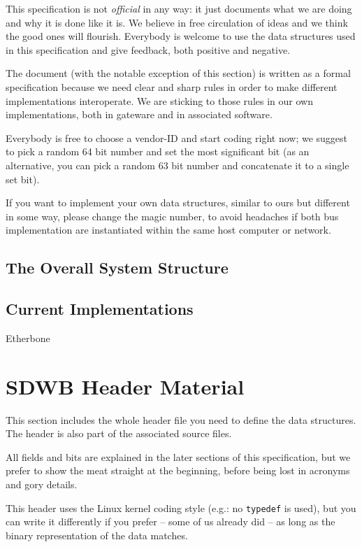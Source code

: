 \documentclass[a4paper, 12pt]{article}
\begin{document}
This specification is not \textit{official} in any way: it just
documents what we are doing and why it is done like it is.  We believe
in free circulation of ideas and we think the good ones will flourish.
Everybody is welcome to use the data structures used in this specification
and give feedback, both positive and negative.

The document (with the notable exception of this section) is written
as a formal specification because we need clear and sharp rules in
order to make different implementations interoperate.  We are sticking
to those rules in our own implementations, both in gateware and in
associated software.

Everybody is free to choose a vendor-ID and start coding right now; we
suggest to pick a random 64 bit number and set the most significant
bit (as an alternative, you can pick a random 63 bit number and
concatenate it to a single set bit).

If you want to implement your own data structures, similar to ours
but different in some way, please change the magic number, to avoid
headaches if both bus implementation are instantiated within the same host
computer or network.

\subsection{The Overall System Structure}


\subsection{Current Implementations}

Etherbone

\section{SDWB Header Material}

This section includes the whole header file you need to define
the data structures. The header is also part of the associated source files.

All fields and bits are explained in the later sections of this
specification, but we prefer to show the meat straight at the
beginning, before being lost in acronyms and gory details.

This header uses the Linux kernel coding style (e.g.: no \texttt{typedef} is used),
but you can write it differently if you prefer -- some of us already did -- as
long as the binary representation of the data matches.
\end{document}
